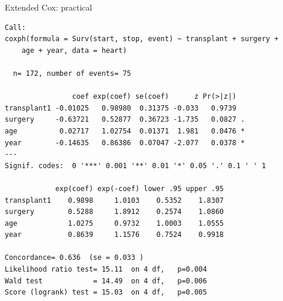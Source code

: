 \documentclass[12pt,english,pdf,xcolor=dvipsnames,aspectratio=169,handout]{beamer}\usepackage[]{graphicx}\usepackage[]{xcolor}
\makeatletter
\newenvironment{kframe}{%
 \def\at@end@of@kframe{}%
 \ifinner\ifhmode%
  \def\at@end@of@kframe{\end{minipage}}%
  \begin{minipage}{\columnwidth}%
 \fi\fi%
 \def\FrameCommand##1{\hskip\@totalleftmargin \hskip-\fboxsep
 \colorbox{shadecolor}{##1}\hskip-\fboxsep
     \hskip-\linewidth \hskip-\@totalleftmargin \hskip\columnwidth}%
 \MakeFramed {\advance\hsize-\width
   \@totalleftmargin\z@ \linewidth\hsize
   \@setminipage}}%
 {\par\unskip\endMakeFramed%
 \at@end@of@kframe}
\newenvironment{knitrout}{}{} %
\makeatother
\begin{document}
\begin{frame}[fragile]{Extended Cox: practical}
\begin{knitrout}\tiny
{}\color{fgcolor}\begin{kframe}
\begin{verbatim}
Call:
coxph(formula = Surv(start, stop, event) ~ transplant + surgery + 
    age + year, data = heart)

  n= 172, number of events= 75 

                coef exp(coef) se(coef)      z Pr(>|z|)  
transplant1 -0.01025   0.98980  0.31375 -0.033   0.9739  
surgery     -0.63721   0.52877  0.36723 -1.735   0.0827 .
age          0.02717   1.02754  0.01371  1.981   0.0476 *
year        -0.14635   0.86386  0.07047 -2.077   0.0378 *
---
Signif. codes:  0 '***' 0.001 '**' 0.01 '*' 0.05 '.' 0.1 ' ' 1

            exp(coef) exp(-coef) lower .95 upper .95
transplant1    0.9898     1.0103    0.5352    1.8307
surgery        0.5288     1.8912    0.2574    1.0860
age            1.0275     0.9732    1.0003    1.0555
year           0.8639     1.1576    0.7524    0.9918

Concordance= 0.636  (se = 0.033 )
Likelihood ratio test= 15.11  on 4 df,   p=0.004
Wald test            = 14.49  on 4 df,   p=0.006
Score (logrank) test = 15.03  on 4 df,   p=0.005
\end{verbatim}
\end{kframe}
\end{knitrout}

\end{frame}
\end{document}
